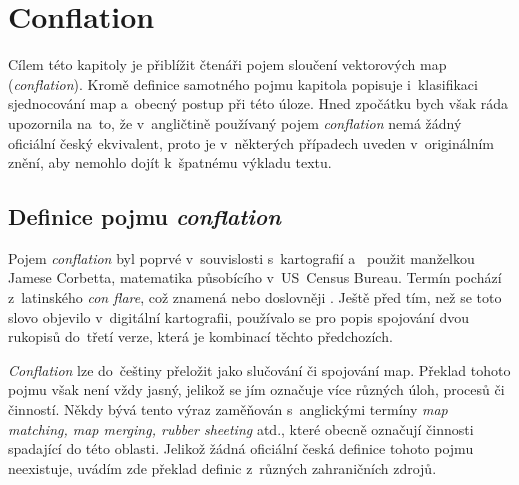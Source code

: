 \chapter{Conflation}
\label{2-conflation}

Cílem této kapitoly je přiblížit čtenáři pojem sloučení vektorových map
(\textit{conflation}). Kromě definice samotného pojmu kapitola popisuje 
i~klasifikaci sjednocování map a~obecný postup při této úloze. Hned zpočátku
bych však ráda upozornila na~to, že v~angličtině používaný pojem 
\textit{conflation} nemá žádný oficiální český ekvivalent, proto je v~některých
případech uveden v~originálním znění, aby nemohlo dojít k~špatnému výkladu 
textu.

\section{Definice pojmu \textit{conflation}}
\label{definice}

Pojem \textit{conflation} byl poprvé v~souvislosti s~kartografií a~
použit manželkou Jamese Corbetta, matematika působícího v~US~Census Bureau.
Termín pochází z~latinského \textit{con flare}, což znamená 
nebo doslovněji . Ještě před tím, než se toto slovo 
objevilo v~digitální kartografii, používalo se pro popis spojování dvou 
rukopisů do~třetí verze, která je kombinací těchto předchozích.

\textit{Conflation} lze do~češtiny přeložit jako slučování či spojování map. 
Překlad tohoto pojmu však není vždy jasný, jelikož se jím označuje více různých 
úloh, procesů či činností. Někdy bývá tento výraz zaměňován s~anglickými 
termíny \textit{map matching, map merging, rubber sheeting} atd., které obecně
označují činnosti spadající do této oblasti. Jelikož žádná oficiální česká
definice tohoto pojmu neexistuje, uvádím zde překlad definic z~různých 
zahraničních zdrojů. 

